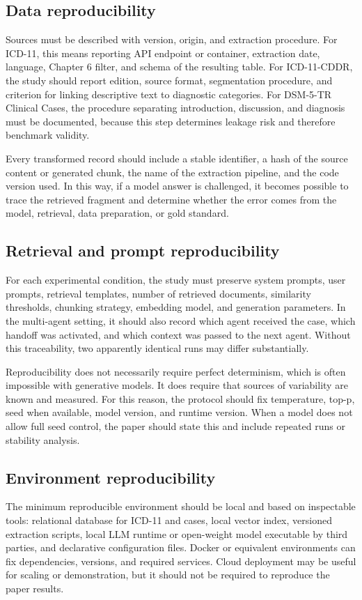 \documentclass[11pt,a4paper]{article}
\begin{document}
\subsection{Data reproducibility}
Sources must be described with version, origin, and extraction procedure. For ICD-11, this means reporting API endpoint or container, extraction date, language, Chapter 6 filter, and schema of the resulting table. For ICD-11-CDDR, the study should report edition, source format, segmentation procedure, and criterion for linking descriptive text to diagnostic categories. For DSM-5-TR Clinical Cases, the procedure separating introduction, discussion, and diagnosis must be documented, because this step determines leakage risk and therefore benchmark validity.

Every transformed record should include a stable identifier, a hash of the source content or generated chunk, the name of the extraction pipeline, and the code version used. In this way, if a model answer is challenged, it becomes possible to trace the retrieved fragment and determine whether the error comes from the model, retrieval, data preparation, or gold standard.

\subsection{Retrieval and prompt reproducibility}
For each experimental condition, the study must preserve system prompts, user prompts, retrieval templates, number of retrieved documents, similarity thresholds, chunking strategy, embedding model, and generation parameters. In the multi-agent setting, it should also record which agent received the case, which handoff was activated, and which context was passed to the next agent. Without this traceability, two apparently identical runs may differ substantially.

Reproducibility does not necessarily require perfect determinism, which is often impossible with generative models. It does require that sources of variability are known and measured. For this reason, the protocol should fix temperature, top-p, seed when available, model version, and runtime version. When a model does not allow full seed control, the paper should state this and include repeated runs or stability analysis.

\subsection{Environment reproducibility}
The minimum reproducible environment should be local and based on inspectable tools: relational database for ICD-11 and cases, local vector index, versioned extraction scripts, local LLM runtime or open-weight model executable by third parties, and declarative configuration files. Docker or equivalent environments can fix dependencies, versions, and required services. Cloud deployment may be useful for scaling or demonstration, but it should not be required to reproduce the paper results.
\end{document}

